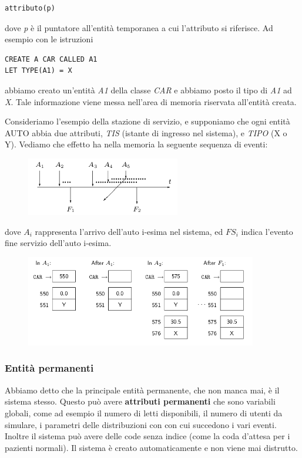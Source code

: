 \documentclass[11pt]{book}
\begin{document}
\begin{verbatim}
attributo(p)
\end{verbatim}

dove {\em p} \`e il puntatore all'entit\`a temporanea a cui l'attributo
si riferisce. Ad esempio con le istruzioni

\begin{verbatim}
CREATE A CAR CALLED A1
LET TYPE(A1) = X
\end{verbatim}

abbiamo creato un'entit\`a {\em A1} della classe {\em CAR} e abbiamo
posto il tipo di {\em A1} ad {\em X}. Tale informazione viene messa
nell'area di memoria riservata all'entit\`a creata. 

Consideriamo l'esempio della stazione di servizio, e supponiamo che
ogni entit\`a AUTO abbia due attributi, {\em TIS} (istante di ingresso
nel sistema), e {\em TIPO} (X o Y). Vediamo che effetto ha nella
memoria la seguente sequenza di eventi:

\begin{figure}[H]
  \centering
  \includegraphics[width=0.6\textwidth]{images/cap11fig32.png}
\end{figure}

dove $A_i$ rappresenta l'arrivo dell'auto i-esima nel sistema, ed
$FS_i$ indica l'evento fine servizio dell'auto i-esima.

\begin{figure}[H]
  \centering
  \includegraphics[width=0.9\textwidth]{images/cap11fig33.png}
\end{figure}

\subsubsection{Entit\`a permanenti}
Abbiamo detto che la principale entit\`a permanente, che non manca mai,
\`e il sistema stesso. Questo pu\`o avere {\bf attributi permanenti} che
sono variabili globali, come ad esempio il numero di letti
disponibili, il numero di utenti da simulare, i parametri delle
distribuzioni con con cui succedono i vari eventi. Inoltre il sistema
pu\`o avere delle code senza indice (come la coda d'attesa per i
pazienti normali). Il sistema \`e creato automaticamente e non viene
mai distrutto.
\end{document}
